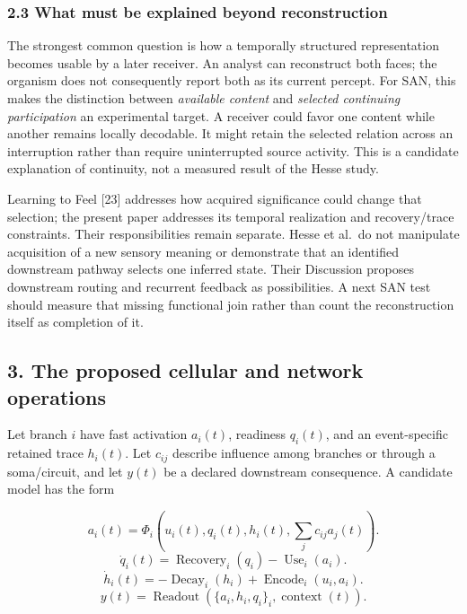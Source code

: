 \documentclass[
  american,
  11pt,
  letterpaper,
]{article}
\begin{document}
\subsubsection{2.3 What must be explained beyond reconstruction}\label{what-must-be-explained-beyond-reconstruction}

The strongest common question is how a temporally structured representation becomes usable by a later receiver. An analyst can reconstruct both faces; the organism does not consequently report both as its current percept. For SAN, this makes the distinction between \emph{available content} and \emph{selected continuing participation} an experimental target. A receiver could favor one content while another remains locally decodable. It might retain the selected relation across an interruption rather than require uninterrupted source activity. This is a candidate explanation of continuity, not a measured result of the Hesse study.

Learning to Feel {[}23{]} addresses how acquired significance could change that selection; the present paper addresses its temporal realization and recovery/trace constraints. Their responsibilities remain separate. Hesse et al.~do not manipulate acquisition of a new sensory meaning or demonstrate that an identified downstream pathway selects one inferred state. Their Discussion proposes downstream routing and recurrent feedback as possibilities. A next SAN test should measure that missing functional join rather than count the reconstruction itself as completion of it.

\subsection{3. The proposed cellular and network operations}\label{the-proposed-cellular-and-network-operations}

Let branch \(i\) have fast activation \(a_i(t)\), readiness \(q_i(t)\), and an event-specific retained trace \(h_i(t)\). Let \(c_{ij}\) describe influence among branches or through a soma/circuit, and let \(y(t)\) be a declared downstream consequence. A candidate model has the form

\[
a_i(t)=\Phi_i\!\left(u_i(t),q_i(t),h_i(t),\sum_j c_{ij}a_j(t)\right).
\tag{1}
\] \[
\dot q_i(t)=\operatorname{Recovery}_i(q_i)-\operatorname{Use}_i(a_i).
\tag{2}
\] \[
\dot h_i(t)=-\operatorname{Decay}_i(h_i)+\operatorname{Encode}_i(u_i,a_i).
\tag{3}
\] \[
y(t)=\operatorname{Readout}\!\left(\{a_i,h_i,q_i\}_i,\operatorname{context}(t)\right).
\tag{4}
\]
\end{document}
